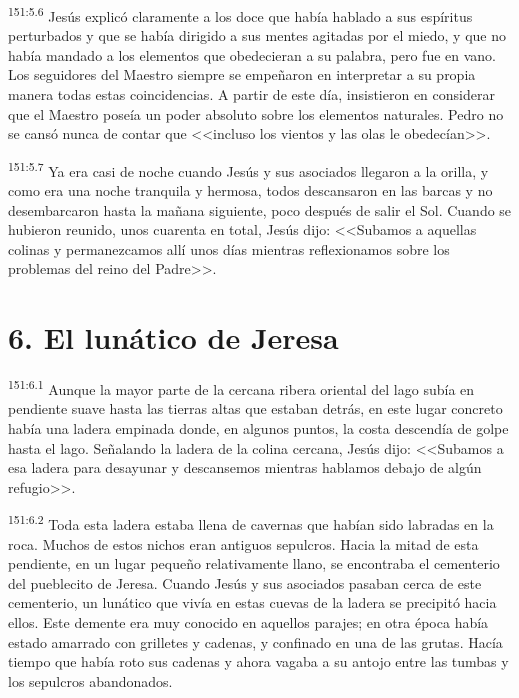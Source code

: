 \par 
\textsuperscript{151:5.6} Jesús explicó claramente a los doce que había hablado a sus espíritus perturbados y que se había dirigido a sus mentes agitadas por el miedo, y que no había mandado a los elementos que obedecieran a su palabra, pero fue en vano. Los seguidores del Maestro siempre se empeñaron en interpretar a su propia manera todas estas coincidencias. A partir de este día, insistieron en considerar que el Maestro poseía un poder absoluto sobre los elementos naturales. Pedro no se cansó nunca de contar que <<incluso los vientos y las olas le obedecían>>.

\par 
\textsuperscript{151:5.7} Ya era casi de noche cuando Jesús y sus asociados llegaron a la orilla, y como era una noche tranquila y hermosa, todos descansaron en las barcas y no desembarcaron hasta la mañana siguiente, poco después de salir el Sol. Cuando se hubieron reunido, unos cuarenta en total, Jesús dijo: <<Subamos a aquellas colinas y permanezcamos allí unos días mientras reflexionamos sobre los problemas del reino del Padre>>.

\section*{6. El lunático de Jeresa}
\par 
\textsuperscript{151:6.1} Aunque la mayor parte de la cercana ribera oriental del lago subía en pendiente suave hasta las tierras altas que estaban detrás, en este lugar concreto había una ladera empinada donde, en algunos puntos, la costa descendía de golpe hasta el lago. Señalando la ladera de la colina cercana, Jesús dijo: <<Subamos a esa ladera para desayunar y descansemos mientras hablamos debajo de algún refugio>>.

\par 
\textsuperscript{151:6.2} Toda esta ladera estaba llena de cavernas que habían sido labradas en la roca. Muchos de estos nichos eran antiguos sepulcros. Hacia la mitad de esta pendiente, en un lugar pequeño relativamente llano, se encontraba el cementerio del pueblecito de Jeresa. Cuando Jesús y sus asociados pasaban cerca de este cementerio, un lunático que vivía en estas cuevas de la ladera se precipitó hacia ellos. Este demente era muy conocido en aquellos parajes; en otra época había estado amarrado con grilletes y cadenas, y confinado en una de las grutas. Hacía tiempo que había roto sus cadenas y ahora vagaba a su antojo entre las tumbas y los sepulcros abandonados.

